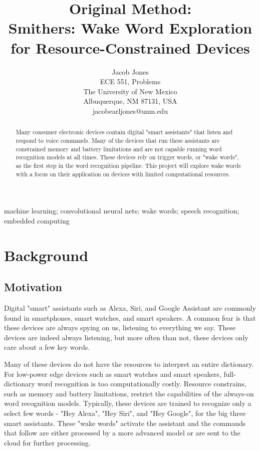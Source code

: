 \documentclass[conference]{IEEEtran}
\begin{document}
\title{Original Method: \\
    Smithers: Wake Word Exploration for Resource-Constrained Devices}
\author{ Jacob Jones \\
    ECE 551, Problems \\
    The University of New Mexico \\
    Albuquerque, NM 87131, USA \\
    jacobearljones@unm.edu}

\maketitle

\begin{abstract}

    Many consumer electronic devices contain digital "smart assistants"
    that listen and respond to voice commands.
    Many of the devices that run these assistants are constrained memory and battery limitations
    and are not capable running word recognition models at all times.
    These devices rely on trigger words, or "wake words", as the first step
    in the word recognition pipeline.
    This project will explore wake words with a focus on their application
    on devices with limited computational resources.

\end{abstract}
\begin{IEEEkeywords}
    machine learning; convolutional neural nets; wake words; speech recognition; embedded computing
\end{IEEEkeywords}
\IEEEpeerreviewmaketitle

\section{Background}

\subsection{Motivation}

Digital "smart" assistants such as Alexa, Siri, and Google Assistant are commonly found
in smartphones, smart watches, and smart speakers.
A common fear is that these devices are always spying on us, listening to everything we say.
These devices are indeed always listening,
but more often than not,
these devices only care about a few key words.

Many of these devices do not have the resources to interpret an entire dictionary.
For low-power edge devices such as smart watches and smart speakers,
full-dictionary word recognition is too computationally costly.
Resource constrains, such as memory and battery limitations,
restrict the capabilities of the always-on word recognition models. 
Typically, these devices are trained to recognize only a select few words -
"Hey Alexa", "Hey Siri", and "Hey Google", for the big three smart assistants.
These "wake words" activate the assistant 
and the commands that follow are either processed by a more advanced model
or are sent to the cloud for further processing.
\end{document}
